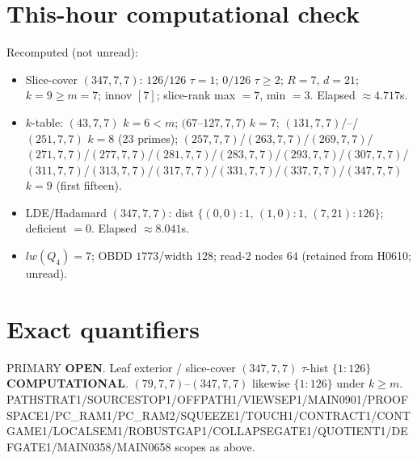 \documentclass[11pt]{article}
\begin{document}
\section*{This-hour computational check}
Recomputed (not unread):
\begin{itemize}
\item Slice-cover $(347,7,7)$: $126/126$ $\tau{=}1$; $0/126$ $\tau{\ge}2$; $R{=}7$, $d{=}21$;
  $k{=}9{\ge}m{=}7$; innov $[7]$; slice-rank max $=7$, min $=3$. Elapsed $\approx4.717$s.
\item $k$-table: $(43,7,7)$ $k{=}6{\lt}m$; $(67$--$127,7,7)$ $k{=}7$;
  $(131,7,7)$/--/$(251,7,7)$ $k{=}8$ (23 primes); $(257,7,7)$/$(263,7,7)$/$(269,7,7)$/$(271,7,7)$/$(277,7,7)$/$(281,7,7)$/$(283,7,7)$/$(293,7,7)$/$(307,7,7)$/$(311,7,7)$/$(313,7,7)$/$(317,7,7)$/$(331,7,7)$/$(337,7,7)$/$(347,7,7)$ $k{=}9$ (first fifteen).
\item LDE/Hadamard $(347,7,7)$: dist $\{(0,0){:}1,\,(1,0){:}1,\,(7,21){:}126\}$; deficient $=0$. Elapsed $\approx8.041$s.
\item $lw(Q_4)=7$; OBDD $1773$/width $128$; read-$2$ nodes $64$ (retained from H0610; unread).
\end{itemize}

\section*{Exact quantifiers}
PRIMARY \textbf{OPEN}. Leaf exterior / slice-cover $(347,7,7)$ $\tau$-hist $\{1{:}126\}$ \textbf{COMPUTATIONAL}.
$(79,7,7)$--$(347,7,7)$ likewise $\{1{:}126\}$ under $k{\ge}m$.
PATHSTRAT1/SOURCESTOP1/OFFPATH1/VIEWSEP1/MAIN0901/PROOFSPACE1/PC\_RAM1/PC\_RAM2/SQUEEZE1/TOUCH1/CONTRACT1/CONTGAME1/LOCALSEM1/ROBUSTGAP1/COLLAPSEGATE1/QUOTIENT1/DEFGATE1/MAIN0358/MAIN0658 scopes as above.
\end{document}
